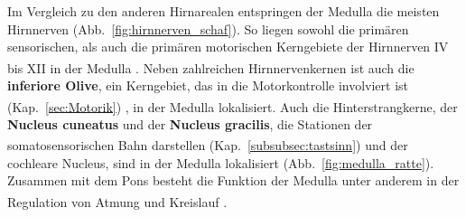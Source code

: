 \noindent Im Vergleich zu den anderen Hirnarealen entspringen der Medulla die meisten Hirnnerven (Abb.~\ref{fig:hirnnerven_schaf}). So liegen sowohl die primären sensorischen, als auch die primären motorischen Kerngebiete der Hirnnerven IV bis XII in der Medulla \textsuperscript{\cite[Kap.~14]{penzlin2005tierphys}}. Neben zahlreichen Hirnnervenkernen ist auch die \textbf{inferiore Olive}, ein Kerngebiet, das in die Motorkontrolle involviert ist (Kap.~\ref{sec:Motorik})  \textsuperscript{\cite[Kap.~9]{crossman2014neuroanatomy}}, in der Medulla lokalisiert. Auch die Hinterstrangkerne, der \textbf{Nucleus cuneatus} und der \textbf{Nucleus gracilis}, die Stationen der somatosensorischen Bahn darstellen (Kap.~\ref{subsubsec:tastsinn}) \textsuperscript{\cite[Kap.~5]{trepel2011neuroanatomie}} und der cochleare Nucleus, sind in der Medulla lokalisiert (Abb.~\ref{fig:medulla_ratte}). Zusammen mit dem Pons besteht die Funktion der Medulla unter anderem in der Regulation von Atmung und Kreislauf \textsuperscript{\cite[Kap.~14]{penzlin2005tierphys}}.

